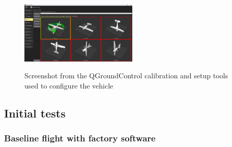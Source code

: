 \begin{figure}
  \centering
  \\
  \includegraphics[width=0.5\textwidth, keepaspectratio]{img/qgc-config-2.png}
  \caption{Screenshot from the QGroundControl calibration and setup tools used to configure the vehicle}\label{fig:qgc-config}
\end{figure}


\subsection{Initial tests}
\label{sec:test-8-flight}


\subsubsection{Baseline flight with factory software}
\label{subsec:fl-test-1}

